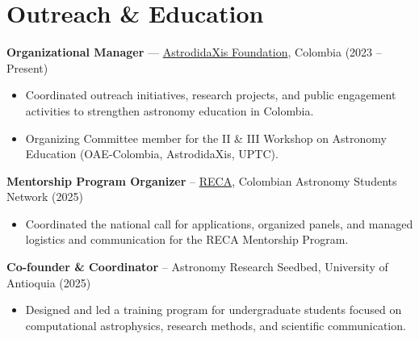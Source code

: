\section*{Outreach \& Education}
\textbf{Organizational Manager} — \href{https://sites.google.com/view/astrodidaxis/home?authuser=0}{AstrodidaXis Foundation}, Colombia (2023 -- Present)
\begin{itemize}
    \item Coordinated outreach initiatives, research projects, and public engagement activities to strengthen astronomy education in Colombia.
    \item Organizing Committee member for the II \& III Workshop on Astronomy Education (OAE-Colombia, AstrodidaXis, UPTC).
\end{itemize}

\textbf{Mentorship Program Organizer} -- \href{https://www.astroreca.org/en}{RECA}, Colombian Astronomy Students Network (2025)
\begin{itemize}
    \item Coordinated the national call for applications, organized panels, and managed logistics and communication for the RECA Mentorship Program.
\end{itemize}

\textbf{Co-founder \& Coordinator} -- Astronomy Research Seedbed, University of Antioquia (2025)
\begin{itemize}
    \item Designed and led a training program for undergraduate students focused on computational astrophysics, research methods, and scientific communication.
\end{itemize}
